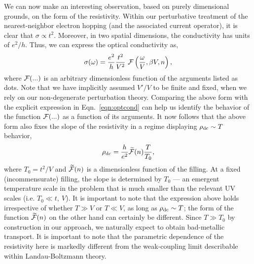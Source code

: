 \documentclass[aps,prx,onecolumn,amsmath,nofootinbib,amssymb,11pt]{revtex4-1}
\def \beq {\begin{eqnarray}}
\def \eeq {\end{eqnarray}}
\def \tn {\textnormal}
\def \rd {\rho_{\tn{dc}}}
\begin{document}
{We can now make an interesting observation, based on purely dimensional grounds, on the form of the resistivity. Within our perturbative treatment of the nearest-neighbor electron hopping (and the associated current operator), it is clear that $\sigma\propto t^2$. Moreover, in two spatial dimensions, the conductivity has units of $e^2/h$. Thus, we can express the optical conductivity as,
\beq
\sigma(\omega)=\frac{e^2}{h}\frac{t^2}{V^2}~ {\cal{F}}\left(\frac{\omega}{V},\beta V,n \right),
\eeq
where ${\cal{F}}(...)$ is an arbitrary dimensionless function of the arguments listed as dots. Note that we have implicitly assumed $V'/V$ to be finite and fixed, when we rely on our non-degenerate perturbation theory. Comparing the above form with the explicit expression in Eqn.~\ref{eqn:optcond} can help us identify the behavior of the function ${\cal{F}}(...)$ as a function of its arguments. It now follows that the above form also fixes the slope of the resistivity in a regime displaying $\rd\sim T$ behavior,
\beq
\rd =\frac{h}{e^2} \widetilde{{\cal{F}}}(n)\frac{T}{T_0},
\label{eqn:Tlin}
\eeq
where $T_0=t^2/V$ and $\widetilde{{\cal{F}}}(n)$ is a dimensionless function of the filling. At a fixed (incommensurate) filling, the slope is determined by $T_0$ --- an emergent temperature scale in the problem that is much smaller than the relevant UV scales (i.e. $T_0\ll t,~V$). It is important to note that the expression above holds irrespective of whether $T\gg V$ or $T\ll V$, as long as $\rd\sim T$; the form of the function $\widetilde{{\cal{F}}}(n)$ on the other hand can certainly be different. Since $T\gg T_0$ by construction in our approach, we naturally expect to obtain bad-metallic transport. It is important to note that the parametric dependence of the resistivity here is markedly different from the weak-coupling limit describable within Landau-Boltzmann theory. 

}
\end{document}
